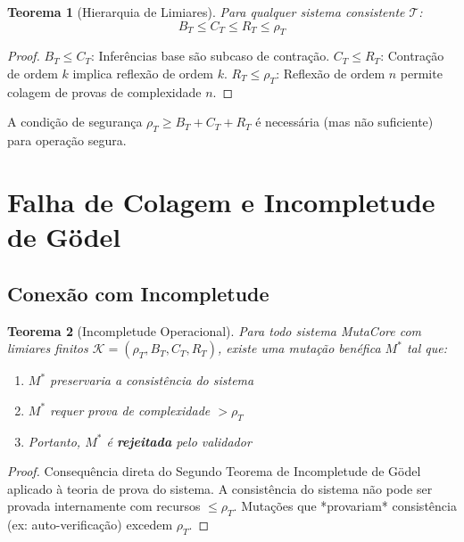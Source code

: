 \documentclass[11pt,a4paper]{article}
\newtheorem{theorem}{Teorema}[section]
\newcommand{\rhoT}{\rho_T}
\newcommand{\BT}{B_T}
\newcommand{\CT}{C_T}
\newcommand{\RT}{R_T}
\begin{document}
\begin{theorem}[Hierarquia de Limiares]
\label{thm:hierarchy}
Para qualquer sistema consistente $\mathcal{T}$:
\begin{equation}
    \BT \le \CT \le \RT \le \rhoT
\end{equation}
\end{theorem}

\begin{proof}
$\BT \le \CT$: Inferências base são subcaso de contração. $\CT \le \RT$: Contração de ordem $k$ implica reflexão de ordem $k$. $\RT \le \rhoT$: Reflexão de ordem $n$ permite colagem de provas de complexidade $n$.
\end{proof}

\begin{corollary}
A condição de segurança $\rhoT \ge \BT + \CT + \RT$ é necessária (mas não suficiente) para operação segura.
\end{corollary}

\section{Falha de Colagem e Incompletude de Gödel}

\subsection{Conexão com Incompletude}

\begin{theorem}[Incompletude Operacional]
\label{thm:incompleteness}
Para todo sistema MutaCore com limiares finitos $\mathcal{K} = (\rhoT, \BT, \CT, \RT)$, existe uma mutação benéfica $M^*$ tal que:
\begin{enumerate}
    \item $M^*$ preservaria a consistência do sistema
    \item $M^*$ requer prova de complexidade $> \rhoT$
    \item Portanto, $M^*$ é \textbf{rejeitada} pelo validador
\end{enumerate}
\end{theorem}

\begin{proof}
Consequência direta do Segundo Teorema de Incompletude de Gödel aplicado à teoria de prova do sistema. A consistência do sistema não pode ser provada internamente com recursos $\le \rhoT$. Mutações que *provariam* consistência (ex: auto-verificação) excedem $\rhoT$.
\end{proof}
\end{document}
